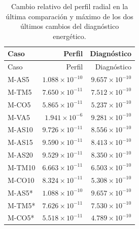 \begin{longtable}{lrr}
\caption{Cambio relativo del perfil radial en la última comparación y máximo de los dos últimos cambios del diagnóstico energético.}\label{t:temp}\\
\hline Caso & Perfil & Diagnóstico \\ \hline\endfirsthead
\hline Caso & Perfil & Diagnóstico \\ \hline\endhead
M-AS5 & $1.088\times 10^{-10}$ & $9.657\times 10^{-10}$ \\
M-TM5 & $7.650\times 10^{-11}$ & $7.512\times 10^{-10}$ \\
M-CO5 & $5.865\times 10^{-11}$ & $5.237\times 10^{-10}$ \\
M-VA5 & $1.941\times 10^{-6}$ & $9.281\times 10^{-10}$ \\
M-AS10 & $9.726\times 10^{-11}$ & $8.556\times 10^{-10}$ \\
M-AS15 & $9.590\times 10^{-11}$ & $8.413\times 10^{-10}$ \\
M-AS20 & $9.529\times 10^{-11}$ & $8.350\times 10^{-10}$ \\
M-TM10 & $6.663\times 10^{-11}$ & $6.503\times 10^{-10}$ \\
M-CO10 & $8.324\times 10^{-11}$ & $5.308\times 10^{-10}$ \\
M-AS5* & $1.088\times 10^{-10}$ & $9.657\times 10^{-10}$ \\
M-TM5* & $7.626\times 10^{-11}$ & $7.530\times 10^{-10}$ \\
M-CO5* & $5.518\times 10^{-11}$ & $4.789\times 10^{-10}$ \\
\hline\end{longtable}\endgroup
